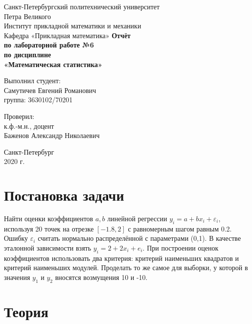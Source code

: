 \documentclass[12pt,a4paper]{article}
\begin{document}
	
\begin{titlepage}
	\begin{center}		
		\vfill	
		Санкт-Петербургский политехнический университет \\
		Петра Великого\\
		\vskip 1cm
		Институт прикладной математики и механики \\
		Кафедра «Прикладная математика»
		\vfill
		\textbf{Отчёт\\
			по лабораторной работе №6\\
			по дисциплине\\
			«Математическая статистика»\\}
		\vfill
	\end{center}
	\vfill
	\hfill
	\begin{minipage}{0.4\textwidth}
		Выполнил студент:\\
		Самутичев Евгений Романович\\
		группа: 3630102/70201\\
	\end{minipage}
	\vfill
	\hfill 
	\begin{minipage}{0.4\textwidth}
		Проверил:\\
		к.ф.-м.н., доцент\\
		Баженов Александр Николаевич\
	\end{minipage}
	\vfill
	\begin{center}
		Санкт-Петербург\\2020 г.
	\end{center}
\end{titlepage}

\tableofcontents
\listoffigures
\pagebreak

\section{Постановка задачи}
Найти оценки коэффициентов $a, b$ линейной регрессии $y_i = a + bx_i + \varepsilon_i$, используя 20 точек на отрезке $[-1.8, 2]$ с равномерным шагом равным 0.2. Ошибку $\varepsilon_i$ считать нормально распределённой с параметрами (0,1). В качестве эталонной зависимости взять $y_i = 2 + 2x_i + e_i$. При построении оценок коэффициентов использовать два критерия: критерий наименьших квадратов и критерий наименьших модулей. Проделать то же самое для выборки, у которой в значения $y_1$ и $y_2$ вносятся
возмущения 10 и -10.
\pagebreak

\section{Теория}
\end{document}
